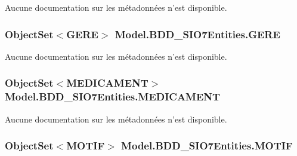 Aucune documentation sur les métadonnées n'est disponible. 

\hypertarget{class_model_1_1_b_d_d___s_i_o7_entities_af2d24722ba6d84b64960611c55b23327}{
\subsubsection[{G\-E\-R\-E}]{\setlength{\rightskip}{0pt plus 5cm}Object\-Set$<${\bf G\-E\-R\-E}$>$ Model.\-B\-D\-D\-\_\-\-S\-I\-O7\-Entities.\-G\-E\-R\-E\hspace{0.3cm}{\ttfamily [get]}}}\label{class_model_1_1_b_d_d___s_i_o7_entities_af2d24722ba6d84b64960611c55b23327}


Aucune documentation sur les métadonnées n'est disponible. 

\hypertarget{class_model_1_1_b_d_d___s_i_o7_entities_a21a0b47c75a9adef3ef5aee8ecedbd37}{
\subsubsection[{M\-E\-D\-I\-C\-A\-M\-E\-N\-T}]{\setlength{\rightskip}{0pt plus 5cm}Object\-Set$<${\bf M\-E\-D\-I\-C\-A\-M\-E\-N\-T}$>$ Model.\-B\-D\-D\-\_\-\-S\-I\-O7\-Entities.\-M\-E\-D\-I\-C\-A\-M\-E\-N\-T\hspace{0.3cm}{\ttfamily [get]}}}\label{class_model_1_1_b_d_d___s_i_o7_entities_a21a0b47c75a9adef3ef5aee8ecedbd37}


Aucune documentation sur les métadonnées n'est disponible. 

\hypertarget{class_model_1_1_b_d_d___s_i_o7_entities_a9bf34ee977b7f671e9996967d1ff2328}{
\subsubsection[{M\-O\-T\-I\-F}]{\setlength{\rightskip}{0pt plus 5cm}Object\-Set$<${\bf M\-O\-T\-I\-F}$>$ Model.\-B\-D\-D\-\_\-\-S\-I\-O7\-Entities.\-M\-O\-T\-I\-F\hspace{0.3cm}{\ttfamily [get]}}}\label{class_model_1_1_b_d_d___s_i_o7_entities_a9bf34ee977b7f671e9996967d1ff2328}


